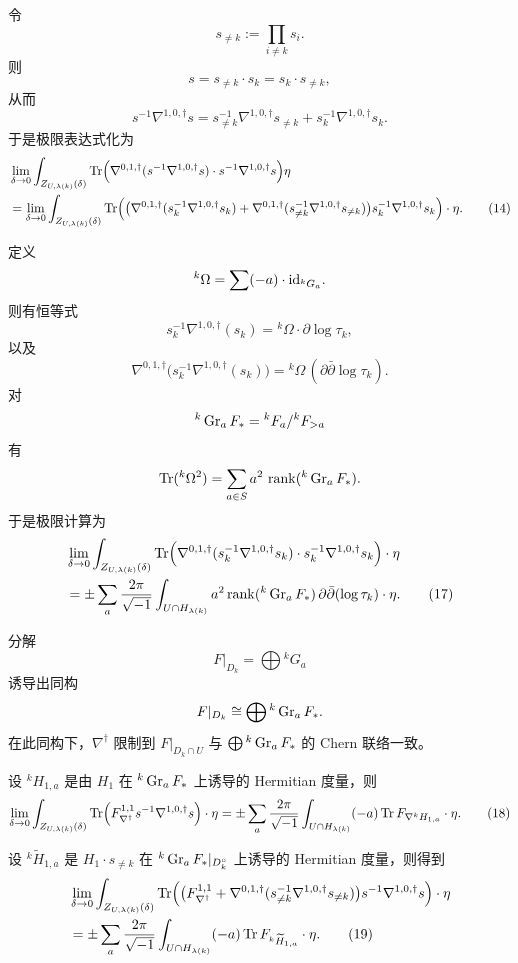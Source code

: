 令
\[
s_{\ne k}:=\prod_{i\ne k}s_i.
\]
则
\[
s=s_{\ne k}\cdot s_k=s_k\cdot s_{\ne k},
\]
从而
\[
s^{-1}\nabla^{1,0,\dagger}s
=
s_{\ne k}^{-1}\nabla^{1,0,\dagger}s_{\ne k}
+
s_k^{-1}\nabla^{1,0,\dagger}s_k. \tag{13}
\]
于是极限表达式化为
\begin{align}
&\lim_{\delta\to 0}
\int_{Z_{U,\lambda(k)}(\delta)}
\operatorname{Tr}\Bigl(
\nabla^{0,1,\dagger}(s^{-1}\nabla^{1,0,\dagger}s)\cdot s^{-1}\nabla^{1,0,\dagger}s
\Bigr)\eta
\nonumber\\
&=
\lim_{\delta\to 0}
\int_{Z_{U,\lambda(k)}(\delta)}
\operatorname{Tr}\Bigl(
\bigl(\nabla^{0,1,\dagger}(s_k^{-1}\nabla^{1,0,\dagger}s_k)
+\nabla^{0,1,\dagger}(s_{\ne k}^{-1}\nabla^{1,0,\dagger}s_{\ne k})\bigr)
s_k^{-1}\nabla^{1,0,\dagger}s_k
\Bigr)\cdot \eta. \tag{14}
\end{align}

定义
\[
{}^k\Omega=\sum (-a)\cdot \mathrm{id}_{{}^kG_a}.
\]
则有恒等式
\[
s_k^{-1}\nabla^{1,0,\dagger}(s_k)={}^k\Omega\cdot \partial \log\tau_k, \tag{15}
\]
以及
\[
\nabla^{0,1,\dagger}\bigl(s_k^{-1}\nabla^{1,0,\dagger}(s_k)\bigr)
=
{}^k\Omega\,(\partial\bar\partial \log\tau_k). \tag{16}
\]
对
\[
{}^k\operatorname{Gr}_aF_*={}^kF_a/{}^kF_{>a}
\]
有
\[
\operatorname{Tr}({}^k\Omega^2)=\sum_{a\in S} a^2\,\operatorname{rank}({}^k\operatorname{Gr}_aF_*).
\]
于是极限计算为
\begin{align}
&\lim_{\delta\to 0}
\int_{Z_{U,\lambda(k)}(\delta)}
\operatorname{Tr}\Bigl(
\nabla^{0,1,\dagger}(s_k^{-1}\nabla^{1,0,\dagger}s_k)\cdot s_k^{-1}\nabla^{1,0,\dagger}s_k
\Bigr)\cdot \eta
\nonumber\\
&=
\pm \sum_a \frac{2\pi}{\sqrt{-1}}
\int_{U\cap H_{\lambda(k)}}
a^2 \operatorname{rank}({}^k\operatorname{Gr}_aF_*)\,\partial\bar\partial(\log\tau_k)\cdot \eta. \tag{17}
\end{align}

分解
\[
F|_{D_k}=\bigoplus {}^kG_a
\]
诱导出同构
\[
F|_{D_k}\cong \bigoplus {}^k\operatorname{Gr}_aF_*.
\]
在此同构下，\(\nabla^\dagger\) 限制到 \(F|_{D_k\cap U}\) 与 \(\bigoplus {}^k\operatorname{Gr}_aF_*\) 的 Chern 联络一致。

设 \({}^kH_{1,a}\) 是由 \(H_1\) 在 \({}^k\operatorname{Gr}_aF_*\) 上诱导的 Hermitian 度量，则
\begin{align}
\lim_{\delta\to 0}
\int_{Z_{U,\lambda(k)}(\delta)}
\operatorname{Tr}\Bigl(
F_{\nabla^\dagger}^{1,1}s^{-1}\nabla^{1,0,\dagger}s
\Bigr)\cdot \eta
=
\pm \sum_a \frac{2\pi}{\sqrt{-1}}
\int_{U\cap H_{\lambda(k)}}
(-a)\operatorname{Tr} F_{\nabla^kH_{1,a}}\cdot \eta. \tag{18}
\end{align}

设 \({}^k\widetilde H_{1,a}\) 是 \(H_1\cdot s_{\ne k}\) 在 \({}^k\operatorname{Gr}_aF_*|_{D_k^\circ}\) 上诱导的 Hermitian 度量，则得到
\begin{align}
&\lim_{\delta\to 0}
\int_{Z_{U,\lambda(k)}(\delta)}
\operatorname{Tr}\Bigl(
\bigl(F_{\nabla^\dagger}^{1,1}
+\nabla^{0,1,\dagger}(s_{\ne k}^{-1}\nabla^{1,0,\dagger}s_{\ne k})\bigr)
s^{-1}\nabla^{1,0,\dagger}s
\Bigr)\cdot \eta
\nonumber\\
&=
\pm \sum_a \frac{2\pi}{\sqrt{-1}}
\int_{U\cap H_{\lambda(k)}}
(-a)\operatorname{Tr} F_{{}^k\widetilde H_{1,a}}\cdot \eta. \tag{19}
\end{align}

